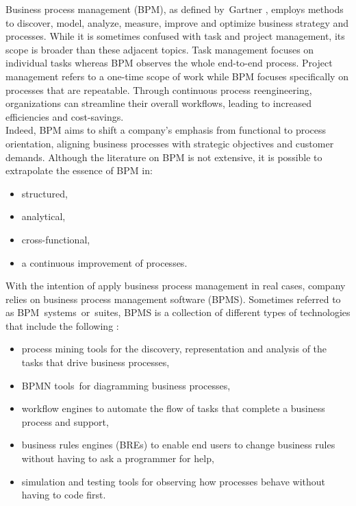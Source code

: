 \documentclass{article}
\begin{document}
Business process management (BPM), as defined by Gartner \cite{Gartner}, employs methods to discover, model, analyze, measure, improve and optimize business strategy and processes. While it is sometimes confused with task and project management, its scope is broader than these adjacent topics. Task management focuses on individual tasks whereas BPM observes the whole end-to-end process. Project management refers to a one-time scope of work while BPM focuses specifically on processes that are repeatable. Through continuous process reengineering, organizations can streamline their overall workflows, leading to increased efficiencies and cost-savings. \\
Indeed, BPM aims to shift a company's emphasis from functional to process orientation, aligning business processes with strategic objectives and customer demands. Although the literature on BPM is not extensive, it is possible to extrapolate the essence of BPM in:
\begin{itemize}
\item structured,
\item analytical,
\item cross-functional,
\item a continuous improvement of processes.
\end{itemize}

With the intention of apply business process management in real cases, company relies on business process management software (BPMS). Sometimes referred to as BPM systems or suites, BPMS is a collection of different types of technologies that include the following \cite{BPMS}:
\begin{itemize}
\item process mining tools for the discovery, representation and analysis of the tasks that drive business processes,
\item BPMN tools for diagramming business processes,
\item workflow engines to automate the flow of tasks that complete a business process and support, \item business rules engines (BREs) to enable end users to change business rules without having to ask a programmer for help,
\item simulation and testing tools for observing how processes behave without having to code first.
\end{itemize}

\end{document}
